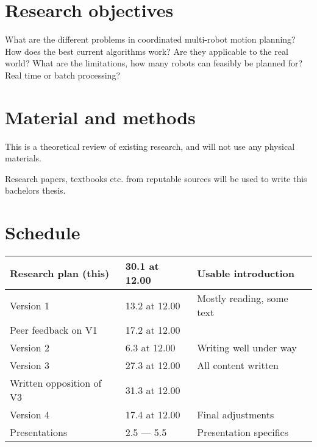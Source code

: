 \documentclass[12pt,a4paper,english,oneside]{article}
\begin{document}
\section{Research objectives}

What are the different problems in coordinated multi-robot motion planning? How does the best current algorithms work? Are they applicable to the real world? What are the limitations, how many robots can feasibly be planned for? Real time or batch processing? 

\section{Material and methods}

This is a theoretical review of existing research, and will not use any physical materials. 

Research papers, textbooks etc. from reputable sources will be used to write this bachelors thesis.


\section{Schedule}

\begin{tabular}{|p{50mm}|p{30mm}|p{65mm}|}
\hline
Research plan (this)   & 30.1 at 12.00 & Usable introduction
\\ \hline
Version 1   & 13.2 at 12.00 & Mostly reading, some text
\\ \hline
Peer feedback on V1 & 17.2 at 12.00 & 
\\ \hline
Version 2   & 6.3 at 12.00 & Writing well under way
\\ \hline
Version 3   & 27.3 at 12.00 & All content written
\\ \hline
Written opposition of V3 & 31.3 at 12.00 & 
\\ \hline
Version 4   & 17.4 at 12.00 & Final adjustments
\\ \hline
Presentations  	& 2.5 --- 5.5 & Presentation specifics
\\ \hline
\end{tabular}


%


% 

\renewcommand{\refname}{References}  %

% 


\end{document}

